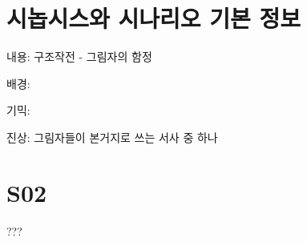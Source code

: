 \documentclass{report}
\begin{document}
	\section{시놉시스와 시나리오 기본 정보}
		내용: 구조작전 - 그림자의 함정
		
		배경: 
		
		기믹: 
		
		진상: 그림자들이 본거지로 쓰는 서사 중 하나
		
	
	\section{S02}
		???
\end{document}

